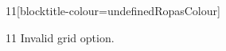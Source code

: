 \documentclass[paper=A4]{ropas-poster}
\begin{document}
\begin{postergrid}{1}{1}[blocktitle-colour=undefinedRopasColour]
\begin{posterblock}{1}{1}
Invalid grid option.
\end{posterblock}
\end{postergrid}
\end{document}
